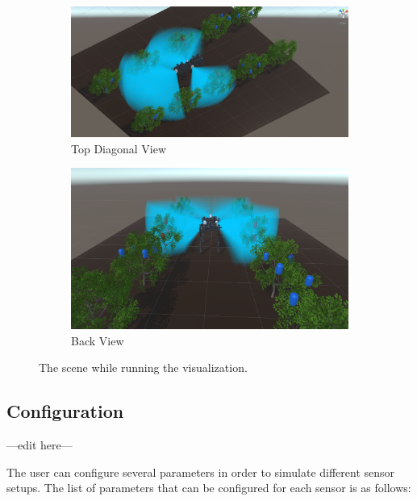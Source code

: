 \documentclass{article}
\begin{document}
\begin{figure}
\centering
\begin{subfigure}[b]{1\textwidth}
   \includegraphics[width=1\linewidth]{FOV(3).png}
   \caption{Top Diagonal View}
\end{subfigure}

\begin{subfigure}[b]{1\textwidth}
   \includegraphics[width=1\linewidth]{FOV(4).png}
   \caption{Back View}
\end{subfigure}
\caption[]{The scene while running the visualization.}
\end{figure}
\clearpage

\subsection{Configuration}

---edit here---

The user can configure several parameters in order to simulate different sensor setups. The list of parameters that can be configured for each sensor is as follows:
\end{document}
